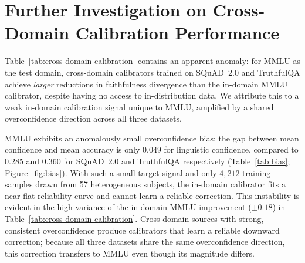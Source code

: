 
\section{Further Investigation on Cross-Domain Calibration Performance}
\label{sec:cross_domain_investigation}

Table~\ref{tab:cross-domain-calibration} contains an apparent anomaly: for MMLU as the
test domain, cross-domain calibrators trained on SQuAD~2.0 and TruthfulQA achieve
\emph{larger} reductions in faithfulness divergence than the in-domain MMLU calibrator,
despite having no access to in-distribution data.
We attribute this to a weak in-domain calibration signal unique to MMLU, amplified by
a shared overconfidence direction across all three datasets.

MMLU exhibits an anomalously small overconfidence bias: the gap between mean confidence
and mean accuracy is only $0.049$ for linguistic confidence, compared to $0.285$ and
$0.360$ for SQuAD~2.0 and TruthfulQA respectively (Table~\ref{tab:bias};
Figure~\ref{fig:bias}).
With such a small target signal and only $4{,}212$ training samples drawn from
57 heterogeneous subjects, the in-domain calibrator fits a near-flat reliability curve
and cannot learn a reliable correction.
This instability is evident in the high variance of the in-domain MMLU improvement
($\pm 0.18$) in Table~\ref{tab:cross-domain-calibration}.
Cross-domain sources with strong, consistent overconfidence produce calibrators
that learn a reliable downward correction; because all three datasets share the same
overconfidence direction, this correction transfers to MMLU even though its magnitude
differs.

